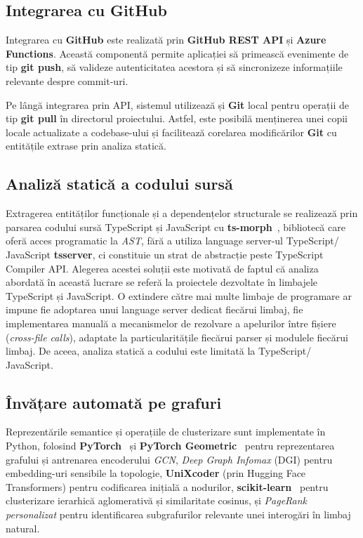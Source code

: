 \documentclass[12pt]{article}
\numberwithin{equation}{section}
\numberwithin{figure}{section}
\numberwithin{table}{section}
\theoremstyle{definition}
\theoremstyle{plain}
\begin{document}
\subsection{Integrarea cu GitHub}

Integrarea cu \textbf{GitHub} este realizată prin \textbf{GitHub REST API} și \textbf{Azure Functions}. Această componentă permite aplicației să primească evenimente de tip \textbf{git push}, să valideze autenticitatea acestora și să sincronizeze informațiile relevante despre commit-uri.

Pe lângă integrarea prin API, sistemul utilizează și \textbf{Git} local pentru operații de tip \textbf{git pull} în directorul proiectului. Astfel, este posibilă menținerea unei copii locale actualizate a codebase-ului și facilitează corelarea modificărilor \textbf{Git} cu entitățile extrase prin analiza statică.

\subsection{Analiză statică a codului sursă}

Extragerea entităților funcționale și a dependențelor structurale se realizează prin parsarea codului sursă TypeScript și JavaScript cu \textbf{ts-morph}~\cite{tsmorph2025}, bibliotecă care oferă acces programatic la \textit{AST}, fără a utiliza language server-ul TypeScript/ JavaScript \textbf{tsserver}, ci constituie un strat de abstracție peste TypeScript Compiler API. Alegerea acestei soluții este motivată de faptul că analiza abordată în această lucrare se referă la proiectele dezvoltate în limbajele TypeScript și JavaScript. O extindere către mai multe limbaje de programare ar impune fie adoptarea unui language server dedicat fiecărui limbaj, fie implementarea manuală a mecanismelor de rezolvare a apelurilor între fișiere (\textit{cross-file calls}), adaptate la particularitățile fiecărui parser și modulele fiecărui limbaj. De aceea, analiza statică a codului este limitată la TypeScript/ JavaScript.

\subsection{Învățare automată pe grafuri}

Reprezentările semantice și operațiile de clusterizare sunt implementate în Python, folosind \textbf{PyTorch}~\cite{paszke2019pytorch} și \textbf{PyTorch Geometric}~\cite{fey2019fast} pentru reprezentarea grafului și antrenarea encoderului \textit{GCN}, \textit{Deep Graph Infomax} (DGI) pentru embedding-uri sensibile la topologie, \textbf{UniXcoder} (prin Hugging Face Transformers) pentru codificarea inițială a nodurilor, \textbf{scikit-learn}~\cite{pedregosa2011sklearn} pentru clusterizare ierarhică aglomerativă și similaritate cosinus, și \textit{PageRank personalizat} pentru identificarea subgrafurilor relevante unei interogări în limbaj natural.
\end{document}
